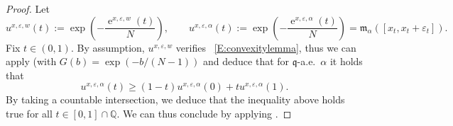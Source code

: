 \documentclass[10pt,a4paper]{amsart}
\DeclareMathOperator{\ee}{e}
\let\epsilon\varepsilon
\let\varepsilon\temp
\newcommand{\Q}{\mathbb{Q}}
\newcommand{\mm}{\mathfrak m}
\newcommand{\q}{\mathfrak{q}}
\begin{document}
\begin{proof}
  Let
  \begin{equation*}
    u^{x,\epsilon,w}(t)
    :=
    \exp
    \left(
      -
      \frac{\ee^{x,\epsilon,w}(t)}{N}
    \right)
    ,
    \qquad
    u^{x,\epsilon,\alpha}(t)
    :=
    \exp
    \left(
      -
      \frac{\ee^{x,\epsilon,\alpha}(t)}{N}
    \right)
    =
    \mm_\alpha([x_t,x_t+\epsilon_t])
    .
  \end{equation*}
  Fix $t\in(0,1)$.
  By assumption, $u^{x,\epsilon,w}$ verifies
 ~\eqref{E:convexitylemma}, thus we can apply
   (with $G(b)=\exp(-b/(N-1))$ and deduce  that for $\q$-a.e.\ $\alpha$ it
  holds that
  \begin{equation*}
    u^{x,\epsilon,\alpha}(t)
    \geq
    (1-t)
    u^{x,\epsilon,\alpha}(0)
    +
    t
    u^{x,\epsilon,\alpha}(1)
    .
  \end{equation*}
  By taking a countable intersection, we deduce that the inequality
  above holds true for all $t\in[0,1]\cap \Q$.
  We can thus conclude by applying .
\end{proof}
\end{document}

